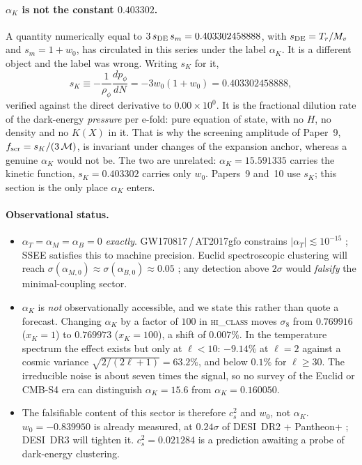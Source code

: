 \documentclass[12pt,a4paper]{article}
\newcommand{\MIRA}{\mathcal{M}}
\begin{document}
\paragraph{$\alpha_K$ is not the constant $0.403302$.}
A quantity numerically equal to $3\,s_{\rm DE}\,s_m = 0.403302458888$,
with $s_{\rm DE} = T_r/M_v$ and $s_m = 1+w_0$, has circulated in this
series under the label $\alpha_K$.  It is a different object and the
label was wrong.  Writing $s_K$ for it,
%
\begin{equation}
  s_K \equiv -\frac{1}{\rho_\phi}\frac{dp_\phi}{dN}
      = -3w_0(1+w_0) = 0.403302458888,
  \label{eq:sK}
\end{equation}
%
verified against the direct derivative to $0.00\times10^{0}$.  It is the
fractional dilution rate of the dark-energy \emph{pressure} per e-fold:
pure equation of state, with no $H$, no density and no $K(X)$ in it.
That is why the screening amplitude of Paper~9,
$f_{\rm scr} = s_K/(3\,\MIRA)$, is invariant under changes of the
expansion anchor, whereas a genuine $\alpha_K$ would not be.
The two are unrelated: $\alpha_K = 15.591335$ carries the kinetic
function, $s_K = 0.403302$ carries only $w_0$.  Papers~9 and~10 use
$s_K$; this section is the only place $\alpha_K$ enters.

\paragraph{Observational status.}
\begin{itemize}
  \item $\alpha_T = \alpha_M = \alpha_B = 0$ \emph{exactly}.
    GW170817\,/\,AT2017gfo constrains $|\alpha_T| \lesssim 10^{-15}$
    \citep{gw170817_2017}; SSEE satisfies this to machine precision.
    Euclid spectroscopic clustering will reach
    $\sigma(\alpha_{M,0}) \approx \sigma(\alpha_{B,0}) \approx 0.05$
    \citep{euclid2024}; any detection above $2\sigma$ would
    \emph{falsify} the minimal-coupling sector.
  \item $\alpha_K$ is \emph{not} observationally accessible, and we state
    this rather than quote a forecast.  Changing $\alpha_K$ by a factor
    of $100$ in \textsc{hi\_class} moves $\sigma_8$ from $0.769916$
    ($x_K=1$) to $0.769973$ ($x_K=100$), a shift of $0.007\%$.  In the
    temperature spectrum the effect exists but only at $\ell < 10$:
    $-9.14\%$ at $\ell=2$ against a cosmic variance
    $\sqrt{2/(2\ell+1)} = 63.2\%$, and below $0.1\%$ for
    $\ell \geq 30$.  The irreducible noise is about seven times the
    signal, so no survey of the Euclid or CMB-S4 era can distinguish
    $\alpha_K = 15.6$ from $\alpha_K = 0.160050$.
  \item The falsifiable content of this sector is therefore $c_s^2$ and
    $w_0$, not $\alpha_K$.  $w_0 = -0.839950$ is already measured, at
    $0.24\sigma$ of DESI~DR2 + Pantheon+ \citep{desidr2_2025}; DESI~DR3
    will tighten it.  $c_s^2 = 0.021284$ is a prediction awaiting a
    probe of dark-energy clustering.
\end{itemize}
\end{document}
